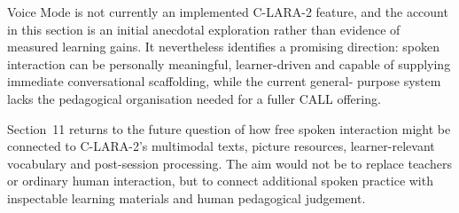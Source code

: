 Voice Mode is not currently an implemented C-LARA-2 feature, and the account
in this section is an initial anecdotal exploration rather than evidence of
measured learning gains. It nevertheless identifies a promising direction:
spoken interaction can be personally meaningful, learner-driven and capable of
supplying immediate conversational scaffolding, while the current general-
purpose system lacks the pedagogical organisation needed for a fuller CALL
offering.

Section~11 returns to the future question of how free spoken interaction might
be connected to C-LARA-2's multimodal texts, picture resources,
learner-relevant vocabulary and post-session processing. The aim would not be
to replace teachers or ordinary human interaction, but to connect additional
spoken practice with inspectable learning materials and human pedagogical
judgement.
